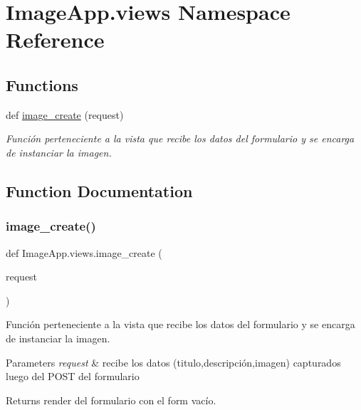 \hypertarget{namespace_image_app_1_1views}{}\section{Image\+App.\+views Namespace Reference}
\label{namespace_image_app_1_1views}
\subsection*{Functions}
\begin{DoxyCompactItemize}
\item 
def \mbox{\hyperlink{namespace_image_app_1_1views_a9e1aa5d4cc84edcd17e73c715c4450ed}{image\+\_\+create}} (request)
\begin{DoxyCompactList}\small\item\em Función perteneciente a la vista que recibe los datos del formulario y se encarga de instanciar la imagen. \end{DoxyCompactList}\end{DoxyCompactItemize}


\subsection{Function Documentation}
\mbox{\label{namespace_image_app_1_1views_a9e1aa5d4cc84edcd17e73c715c4450ed}} 
\subsubsection{\texorpdfstring{image\+\_\+create()}{image\_create()}}
{\footnotesize\ttfamily def Image\+App.\+views.\+image\+\_\+create (\begin{DoxyParamCaption}\item[{}]{request }\end{DoxyParamCaption})}



Función perteneciente a la vista que recibe los datos del formulario y se encarga de instanciar la imagen. 


\begin{DoxyParams}{Parameters}
{\em request} & recibe los datos (titulo,descripción,imagen) capturados luego del P\+O\+ST del formulario \\
\hline
\end{DoxyParams}
\begin{DoxyReturn}{Returns}
render del formulario con el form vacío. 
\end{DoxyReturn}
